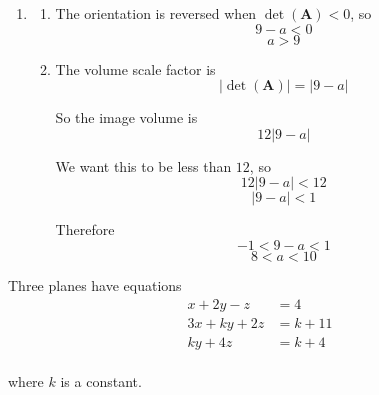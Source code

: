 \documentclass[leqno]{article}
\begin{document}
\begin{enumerate}[
  label=\textbf{\arabic*.},
  leftmargin=*,
  topsep=0pt,
  partopsep=0pt,
  parsep=0pt
]
\begin{djsSolution}
\begin{enumerate}[label=\textbf{(\alph*)}]
\begin{enumerate}[label=(\roman*)]
    Now
    \[
    \begin{pmatrix}9\\0\\1\end{pmatrix}=\begin{pmatrix}1\\-2\\3\end{pmatrix}+2\begin{pmatrix}4\\1\\-1\end{pmatrix}
    \]

    and
    \[
    8=-6+2\times 7
    \]

    So the third equation is obtained by adding the first equation to \(2\) times the second equation.

    Therefore any point which lies on the intersection of the first two planes also lies on the third plane. Since the first two planes are distinct and not parallel, they intersect in a line.

    Hence, when \(a=9\), the three planes form a \textbf{sheaf}: they are distinct and share a common line of intersection, so there are infinitely many solutions.
  \end{enumerate}

  \item
  \begin{enumerate}[label=(\roman*)]
    \item The orientation is reversed when \(\det(\mathbf{A})<0\), so
    \[
    9-a<0
    \]
    \[
    a>9
    \]

    \item The volume scale factor is
    \[
    |\det(\mathbf{A})|=|9-a|
    \]

    So the image volume is
    \[
    12|9-a|
    \]

    We want this to be less than \(12\), so
    \[
    12|9-a|<12
    \]
    \[
    |9-a|<1
    \]

    Therefore
    \[
    -1<9-a<1
    \]
    \[
    8<a<10
    \]
  \end{enumerate}
\end{enumerate}
\end{djsSolution}


\newpage

\questionitem

Three planes have equations
\[
\begin{aligned}
x+2y-z&=4\\
3x+ky+2z&=k+11\\
ky+4z&=k+4
\end{aligned}
\] \\
where $k$ is a constant. \\


\end{enumerate}
\end{document}
